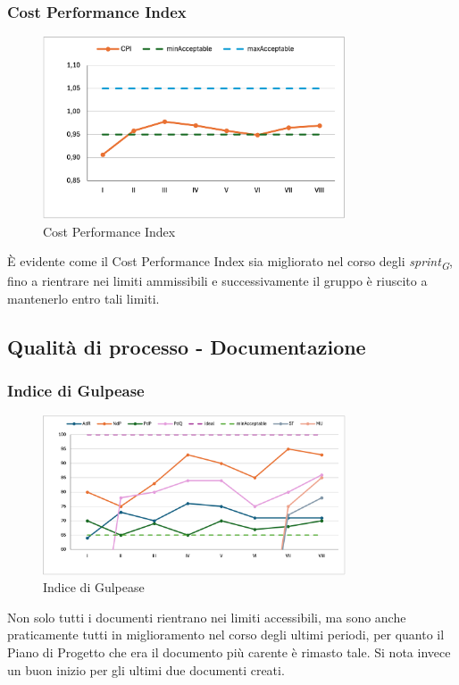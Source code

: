 \subsubsection{Cost Performance Index}
\begin{figure}[H]
    \centering
    \includegraphics[width=0.8\textwidth]{./images/CPI.png}
    \caption{Cost Performance Index}
\end{figure}
È evidente come il Cost Performance Index sia migliorato nel corso degli \textit{sprint\textsubscript{G}}, fino a rientrare nei limiti ammissibili e successivamente il gruppo è riuscito a mantenerlo entro tali limiti.

\subsection{Qualità di processo - Documentazione}
\subsubsection{Indice di Gulpease}
\begin{figure}[H]
    \centering
    \includegraphics[width=0.8\textwidth]{./images/GULPEASE.png}
    \caption{Indice di Gulpease}
\end{figure}
Non solo tutti i documenti rientrano nei limiti accessibili, ma sono anche praticamente tutti in miglioramento nel corso degli ultimi periodi, per quanto il Piano di Progetto che era il documento più carente è rimasto tale. Si nota invece un buon inizio per gli ultimi due documenti creati.

